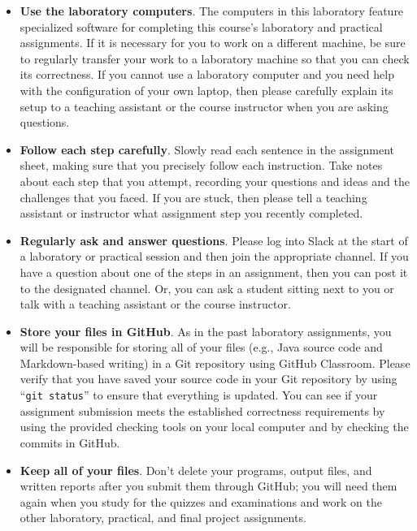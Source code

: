 \documentclass[11pt]{article}
\newcommand{\command}[1]{``\lstinline{#1}''}
\begin{document}
\begin{itemize}
  \setlength{\itemsep}{0pt}

\item {\bf Use the laboratory computers}. The computers in this laboratory feature specialized software for completing
  this course's laboratory and practical assignments. If it is necessary for you to work on a different machine, be sure
  to regularly transfer your work to a laboratory machine so that you can check its correctness. If you cannot use a
  laboratory computer and you need help with the configuration of your own laptop, then please carefully explain its
  setup to a teaching assistant or the course instructor when you are asking questions.

\item {\bf Follow each step carefully}. Slowly read each sentence in the assignment sheet, making sure that you
  precisely follow each instruction. Take notes about each step that you attempt, recording your questions and ideas and
  the challenges that you faced. If you are stuck, then please tell a teaching assistant or instructor what assignment
  step you recently completed.

\item {\bf Regularly ask and answer questions}. Please log into Slack at the start of a laboratory or practical session
  and then join the appropriate channel. If you have a question about one of the steps in an assignment, then you can
  post it to the designated channel. Or, you can ask a student sitting next to you or talk with a teaching assistant or
  the course instructor.

\item {\bf Store your files in GitHub}. As in the past laboratory assignments, you will be responsible for storing all
  of your files (e.g., Java source code and Markdown-based writing) in a Git repository using GitHub Classroom. Please
  verify that you have saved your source code in your Git repository by using \command{git status} to ensure that
  everything is updated. You can see if your assignment submission meets the established correctness requirements by
  using the provided checking tools on your local computer and by checking the commits in GitHub.

\item {\bf Keep all of your files}. Don't delete your programs, output files, and written reports after you submit them
  through GitHub; you will need them again when you study for the quizzes and examinations and work on the other
  laboratory, practical, and final project assignments.


\end{itemize}
\end{document}
